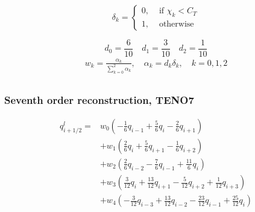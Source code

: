 \begin{equation}
\delta_{k}=\left\{\begin{array}{ll}
0, & \text { if } \chi_{k}<C_{T} \\
1, & \text { otherwise }
\end{array}\right.
\end{equation}

$$d_0=\frac{6}{10} \quad d_1=\frac{3}{10} \quad d_2=\frac{1}{10}$$
\begin{equation}
\begin{array}{l}
w_{k}=\frac{\alpha_{k}}{\sum_{k=0}^{2} \alpha_{k}}, \quad \alpha_{k}=d_k\delta_k, \quad k=0,1,2\\
\end{array}
\end{equation}

\subsubsection{Seventh order reconstruction, TENO7}

\begin{equation}
\begin{aligned}
q_{i+1 / 2}^{l}=& w_{0}\left(-\frac{1}{6} q_{i-1}+\frac{5}{6} q_{i}-\frac{2}{6} q_{i+1}\right) \\
&+w_{1}\left(\frac{2}{6} q_{i}+\frac{5}{6} q_{i+1}-\frac{1}{6} q_{i+2}\right) \\
&+w_{2}\left(\frac{2}{6} q_{i-2}-\frac{7}{6} q_{i-1}+\frac{11}{6} q_{i}\right) \\
&+w_{3}\left(\frac{3}{12} q_{i}+\frac{13}{12} q_{i+1}-\frac{5}{12} q_{i+2}+\frac{1}{12}q_{i+3}\right) \\
&+w_{4}\left(-\frac{3}{12} q_{i-3}+\frac{13}{12} q_{i-2}-\frac{23}{12} q_{i-1}+\frac{25}{12}q_{i}\right) \\
\end{aligned}
\end{equation}


